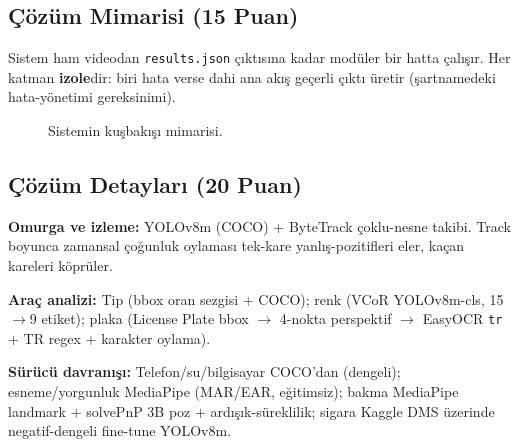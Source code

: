 \documentclass[onecolumn,11pt]{IEEEtran}
\begin{document}
\subsection{Çözüm Mimarisi (15 Puan)}
Sistem ham videodan \texttt{results.json} çıktısına kadar modüler bir hatta
çalışır. Her katman \textbf{izole}dir: biri hata verse dahi ana akış geçerli
çıktı üretir (şartnamedeki hata-yönetimi gereksinimi).

\begin{figure}[h]
\centering
{}
\caption{Sistemin kuşbakışı mimarisi.}
\label{fig:mimari}
\end{figure}

\subsection{Çözüm Detayları (20 Puan)}
\textbf{Omurga ve izleme:} YOLOv8m (COCO) + ByteTrack çoklu-nesne takibi. Track
boyunca zamansal çoğunluk oylaması tek-kare yanlış-pozitifleri eler, kaçan
kareleri köprüler.

\textbf{Araç analizi:} Tip (bbox oran sezgisi + COCO); renk (VCoR YOLOv8m-cls,
15$\rightarrow$9 etiket); plaka (License Plate bbox $\rightarrow$ 4-nokta perspektif
$\rightarrow$ EasyOCR \texttt{tr} + TR regex + karakter oylama).

\textbf{Sürücü davranışı:} Telefon/su/bilgisayar COCO'dan (dengeli); esneme/yorgunluk
MediaPipe (MAR/EAR, eğitimsiz); bakma MediaPipe landmark + solvePnP 3B poz +
ardışık-süreklilik; sigara Kaggle DMS üzerinde negatif-dengeli fine-tune YOLOv8m.
\end{document}
